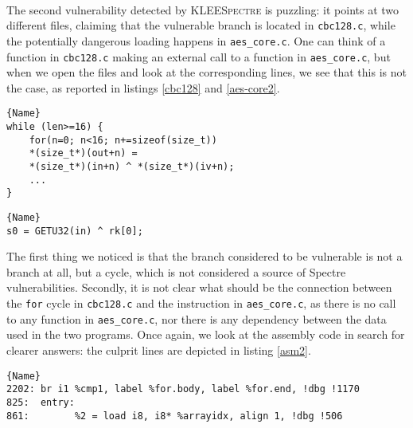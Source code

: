 \documentclass[12pt,a4paper]{book}
\theoremstyle{definition}
\begin{document}
	\paragraph{}The second vulnerability detected by \textsc{KLEESpectre} is puzzling: it points at two different files, claiming that the vulnerable branch is located in \texttt{cbc128.c}, while the potentially dangerous loading happens in \texttt{aes\_core.c}. One can think of a function in \texttt{cbc128.c} making an external call to a function in \texttt{aes\_core.c}, but when we open the files and look at the corresponding lines, we see that this is not the case, as reported in listings \ref{cbc128} and \ref{aes-core2}.
	
	\lstset{
		numbers=left
	}
	\begin{minipage}{.7\textwidth}
		\begin{lstlisting}[caption=\texttt{cbc128.c}, firstnumber=92, label=cbc128]{Name}
while (len>=16) {
	for(n=0; n<16; n+=sizeof(size_t))
	*(size_t*)(out+n) = 
	*(size_t*)(in+n) ^ *(size_t*)(iv+n);
	...
}
		\end{lstlisting}
	\end{minipage}
	
	\begin{minipage}{.5\textwidth}
		\begin{lstlisting}[caption=\texttt{aes\_core.c}, firstnumber=797, label=aes-core2]{Name}
s0 = GETU32(in) ^ rk[0];
		\end{lstlisting}
	\end{minipage}
	\vspace{3mm}
	
	The first thing we noticed is that the branch considered to be vulnerable is not a branch at all, but a cycle, which is not considered a source of Spectre vulnerabilities. Secondly, it is not clear what should be the connection between the \texttt{for} cycle in \texttt{cbc128.c} and the instruction in \texttt{aes\_core.c}, as there is no call to any function in \texttt{aes\_core.c}, nor there is any dependency between the data used in the two programs. Once again, we look at the assembly code in search for clearer answers: the culprit lines are depicted in listing \ref{asm2}.
	
	\lstset{
		numbers=none
	}
	\begin{minipage}{.9\textwidth}
		\begin{lstlisting}[caption=\texttt{assembly.ll} (for AES-CBC), label=asm2]{Name}
2202: br i1 %cmp1, label %for.body, label %for.end, !dbg !1170
825:  entry:  
861:  		%2 = load i8, i8* %arrayidx, align 1, !dbg !506			
		\end{lstlisting}
	\end{minipage}
	\vspace{3mm}
	
\end{document}
